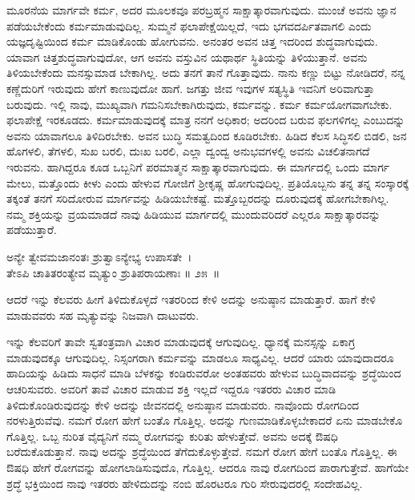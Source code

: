 ಮೂರನೆಯ ಮಾರ್ಗವೇ ಕರ್ಮ, ಅದರ ಮೂಲಕವೂ ಪರಬ್ರಹ್ಮನ ಸಾಕ್ಷಾತ್ಕಾರವಾಗುವುದು. ಮುಂಚೆ ಅವನು ಜ್ಞಾನ ಪಡೆಯಬೇಕೆಂದು ಕರ್ಮಮಾಡುವುದಿಲ್ಲ. ಸುಮ್ಮನೆ ಫಲಾಪೇಕ್ಷೆ\-ಯಿಲ್ಲದೆ, ಇದು ಭಗವದರ್ಪಿತವಾಗಲಿ ಎಂದು ಯಜ್ಞದೃಷ್ಟಿಯಿಂದ ಕರ್ಮ ಮಾಡಿಕೊಂಡು ಹೋಗುವನು. ಅನಂತರ ಅವನ ಚಿತ್ತ ಇದರಿಂದ ಶುದ್ಧವಾಗುವುದು. ಯಾವಾಗ ಚಿತ್ತಶುದ್ಧವಾಗು\-ವುದೋ, ಆಗ ಅವನು ವಸ್ತುವಿನ ಯಥಾರ್ಥ ಸ್ಥಿತಿಯನ್ನು ತಿಳಿಯುತ್ತಾನೆ. ಅವನು ತಿಳಿಯ\-ಬೇಕೆಂದು ಮನಸ್ಸುಮಾಡ ಬೇಕಾಗಿಲ್ಲ. ಅದು ತನಗೆ ತಾನೆ ಗೊತ್ತಾವುದು. ನಾನು ಕಣ್ಣು ಬಿಟ್ಟು ನೋಡಿದರೆ, ನನ್ನ ಕಣ್ಣೆದುರಿಗೆ ಇರುವುದು ಹೇಗೆ ಕಾಣುವುದೋ ಹಾಗೆ. ಜಗತ್ತು ಜೀವ ಇವುಗಳ ಸತ್ಯಸ್ಥಿತಿ ಇವನಿಗೆ ಅರಿವಾಗುತ್ತಾ ಬರುವುದು. ಇಲ್ಲಿ ನಾವು, ಮುಖ್ಯವಾಗಿ ಗಮನಿಸಬೇಕಾಗಿರುವುದು, ಕರ್ಮವನ್ನು. ಕರ್ಮ ಕರ್ಮಯೋಗವಾಗಬೇಕು. ಫಲಾಪೇಕ್ಷೆ ಇರಕೂಡದು. ಕರ್ಮಮಾಡುವುದಕ್ಕೆ ಮಾತ್ರ ನನಗೆ ಅಧಿಕಾರ; ಅದರಿಂದ ಬರುವ ಫಲಗಳಿಗಲ್ಲ ಎಂಬುದನ್ನು ಅವನು ಯಾವಾಗಲೂ ತಿಳಿದಿರಬೇಕು. ಅವನ ಬುದ್ಧಿ ಸಮತ್ವದಿಂದ ಕೂಡಿರಬೇಕು. ಹಿಡಿದ ಕೆಲಸ ಸಿದ್ಧಿಸಲಿ ಬಿಡಲಿ, ಜನ ಹೊಗಳಲಿ, ತೆಗಳಲಿ, ಸುಖ ಬರಲಿ, ದುಃಖ ಬರಲಿ, ಎಲ್ಲಾ ದ್ವಂದ್ವ ಅನುಭವಗಳಲ್ಲಿ ಅವನು ವಿಚಲಿತನಾಗದೆ ಇರುವನು. ಹಾಗಿದ್ದರೂ ಕೂಡ ಒಬ್ಬನಿಗೆ ಪರಮಾತ್ಮನ ಸಾಕ್ಷಾತ್ಕಾರವಾಗುವುದು. ಈ ಮಾರ್ಗದಲ್ಲಿ ಒಂದು ಮಾರ್ಗ ಮೇಲು, ಮತ್ತೊಂದು ಕೀಳು ಎಂದು ಹೇಳುವ ಗೋಜಿಗೆ ಶ‍್ರೀಕೃಷ್ಣ ಹೋಗುವುದಿಲ್ಲ. ಪ್ರತಿಯೊಬ್ಬನು ತನ್ನ ತನ್ನ ಸಂಸ್ಕಾರಕ್ಕೆ ತಕ್ಕಂತೆ ತನಗೆ ಸರಿದೋರುವ ಮಾರ್ಗವನ್ನು ಹಿಡಿಯಬೇಕಷ್ಟೆ. ಮತ್ತೊಬ್ಬರದನ್ನು ದೂರುವುದಕ್ಕೆ ಹೋಗಬೇಕಾಗಿಲ್ಲ. ನಮ್ಮ ಶಕ್ತಿಯನ್ನು ವ್ರಯಮಾಡದೆ ನಾವು ಹಿಡಿಯುವ ಮಾರ್ಗದಲ್ಲಿ ಮುಂದುವರಿದರೆ ಎಲ್ಲರೂ ಸಾಕ್ಷಾತ್ಕಾರವನ್ನು ಪಡೆಯುತ್ತಾರೆ.

\begin{shloka}
ಅನ್ಯೇ ತ್ವೇವಮಜಾನಂತಃ ಶ್ರುತ್ವಾಽನ್ಯೇಭ್ಯ ಉಪಾಸತೇ~।\\ತೇಽಪಿ ಚಾತಿತರಂತ್ಯೇವ ಮೃತ್ಯುಂ ಶ್ರುತಿಪರಾಯಣಾಃ \hfill॥ ೨೫~॥
\end{shloka}

\begin{artha}
ಆದರೆ ಇನ್ನು ಕೆಲವರು ಹೀಗೆ ತಿಳಿದುಕೊಳ್ಳದೆ ಇತರರಿಂದ ಕೇಳಿ ಅದನ್ನು ಅನುಷ್ಠಾನ ಮಾಡುತ್ತಾರೆ. ಹಾಗೆ ಕೇಳಿ ಮಾಡುವವರು ಸಹ ಮೃತ್ಯುವನ್ನು ನಿಜವಾಗಿ ದಾಟುವರು.
\end{artha}

ಇನ್ನು ಕೆಲವರಿಗೆ ತಾವೇ ಸ್ವತಂತ್ರವಾಗಿ ವಿಚಾರ ಮಾಡುವುದಕ್ಕೆ ಆಗುವುದಿಲ್ಲ. ಧ್ಯಾನಕ್ಕೆ ಮನಸ್ಸನ್ನು ಏಕಾಗ್ರ ಮಾಡುವುದಕ್ಕೂ ಆಗುವುದಿಲ್ಲ. ನಿಸ್ಸಂಗರಾಗಿ ಕರ್ಮವನ್ನು ಮಾಡಲೂ ಸಾಧ್ಯವಿಲ್ಲ. ಆದರೆ ಯಾರು ಯಾವುದಾದರೂ ಹಾದಿಯನ್ನು ಹಿಡಿದು ಸಾಧನೆ ಮಾಡಿ ಬೆಳಕನ್ನು ಕಂಡಿರುವರೋ ಅಂತಹವರು ಹೇಳುವ ಬುದ್ಧಿವಾದವನ್ನು ಶ್ರದ್ಧೆಯಿಂದ ಆಚರಿಸುವರು. ಅವರಿಗೆ ತಾವೆ ವಿಚಾರ ಮಾಡುವ ಶಕ್ತಿ ಇಲ್ಲದೆ ಇದ್ದರೂ ಇತರರು ವಿಚಾರ ಮಾಡಿ ತಿಳಿದುಕೊಂಡಿರುವುದನ್ನು ಕೇಳಿ ಅದನ್ನು ಜೀವನದಲ್ಲಿ ಅನುಷ್ಠಾನ ಮಾಡುವರು. ನಾವೊಂದು ರೋಗದಿಂದ ನರಳುತ್ತಿರುವೆವು. ನಮಗೆ ರೋಗ ಹೇಗೆ ಬಂತೊ ಗೊತ್ತಿಲ್ಲ. ಅದನ್ನು ಗುಣಮಾಡಿಕೊಳ್ಳಬೇಕಾದರೆ ಏನು ಮಾಡಬೇಕೊ ಗೊತ್ತಿಲ್ಲ. ಒಬ್ಬ ನುರಿತ ವೈದ್ಯನಿಗೆ ನಮ್ಮ ರೋಗವನ್ನು ಕುರಿತು ಹೇಳುತ್ತೇವೆ. ಅವನು ಅದಕ್ಕೆ ಔಷಧಿ ಬರೆದುಕೊಡುತ್ತಾನೆ. ನಾವು ಅದನ್ನು ಶ್ರದ್ಧೆಯಿಂದ ತೆಗೆದುಕೊಳ್ಳುತ್ತೇವೆ. ನಮಗೆ ರೋಗ ಹೇಗೆ ಬಂತೊ ಗೊತ್ತಿಲ್ಲ. ಈ ಔಷಧಿ ಹೇಗೆ ರೋಗವನ್ನು ಹೋಗಲಾಡಿಸುವುದೊ, ಗೊತ್ತಿಲ್ಲ. ಆದರೂ ನಾವು ರೋಗದಿಂದ ಪಾರಾಗುತ್ತೇವೆ. ಹಾಗೆಯೇ ಶ್ರದ್ಧೆ ಭಕ್ತಿಯಿಂದ ನಾವು ಇತರರು ಹೇಳಿದುದನ್ನು ನಂಬಿ ಹೊರಟರೂ ಗುರಿ ಸೇರುವುದರಲ್ಲಿ ಸಂದೇಹವಿಲ್ಲ.

